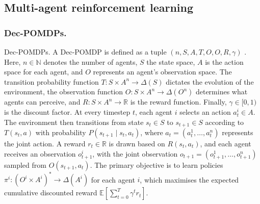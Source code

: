 




\subsection{Multi-agent reinforcement learning}

\subsubsection{Dec-POMDPs.}
Dec-POMDPs. A Dec-POMDP is defined as a tuple $(n, S, A, T, O, O, R, \gamma)$ \cite{oliehoek2008optimal}. Here, $n \in \mathbb{N}$ denotes the number of agents, $S$ the state space, $A$ is the action space for each agent, and $O$ represents an agent’s observation space. The transition probability function $T : S \times A^n \rightarrow \Delta(S)$ dictates the evolution of the environment, the observation function $O : S \times A^n \rightarrow \Delta(O^n)$ determines what agents can perceive, and $R : S \times A^n \rightarrow \mathbb{R}$ is the reward function. Finally, $\gamma \in [0,1)$ is the discount factor. At every timestep $t$, each agent $i$ selects an action $a_t^i \in A$. The environment then transitions from state $s_t \in S$ to $s_{t+1} \in S$ according to $T(s_t, a)$ with probability $P(s_{t+1} \mid s_t, a_t)$, where $a_t = (a_t^1, \ldots, a_t^n)$ represents the joint action. A reward $r_t \in \mathbb{R}$ is drawn based on $R(s_t, a_t)$, and each agent receives an observation $o_{t+1}^i$, with the joint observation $o_{t+1} = (o_{t+1}^1, \ldots, o_{t+1}^n)$ sampled from $O(s_{t+1}, a_t)$. The primary objective is to learn policies $\pi^i : (O^i \times A^i)^* \rightarrow \Delta(A^i)$ for each agent $i$, which maximises the expected cumulative discounted reward $\mathbb{E}\left[\sum_{t=0}^{T} \gamma^t r_t \right]$.

